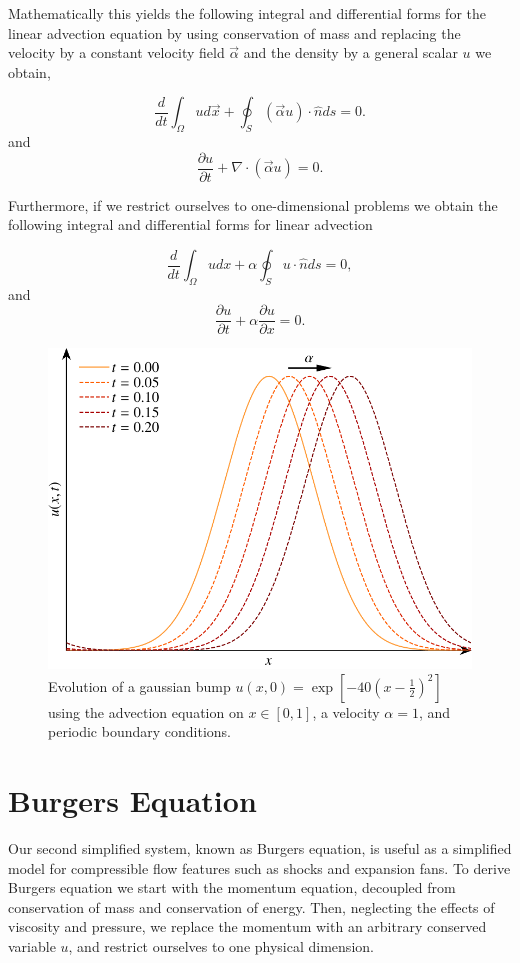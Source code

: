 Mathematically this yields the following integral and differential forms for the linear advection equation by using conservation of mass and replacing the velocity by a constant velocity field $\vec{\alpha}$ and the density by a general scalar $u$ we obtain,
\begin{eqBox}
\begin{equation}
	\frac{d}{dt}\int_\Omega u d\vec{x} + \oint_S (\vec{\alpha}u) \cdot \hat{n} ds = 0.
\end{equation}
and
\begin{equation}
	\frac{\partial u}{\partial t} + \nabla \cdot (\vec{\alpha} u) = 0.
\end{equation}
\end{eqBox}
Furthermore, if we restrict ourselves to one-dimensional problems we obtain the following integral and differential forms for linear advection
\begin{eqBox}
\begin{equation}
	\frac{d}{dt}\int_\Omega u dx + \alpha \oint_S u \cdot \hat{n} ds = 0,
\end{equation}
and
\begin{equation}
	\frac{\partial u}{\partial t} +  \alpha \frac{\partial u}{\partial x} = 0.
\end{equation}
\end{eqBox}
\begin{figure}[htbp]
	\centering
	\includegraphics[width=0.65\linewidth]{Pictures/advection_equation}
	\caption{Evolution of a gaussian bump $u(x,0)=\exp\left[-40\left(x-\frac{1}{2}\right)^2\right]$ using the advection equation on $x\in[0,1]$, a velocity $\alpha=1$, and periodic boundary conditions.}
	\label{fig:advection_equation}
\end{figure}

\section{Burgers Equation}
Our second simplified system, known as Burgers equation, is useful as a simplified model for compressible flow features such as shocks and expansion fans. To derive Burgers equation we start with the momentum equation, decoupled from conservation of mass and conservation of energy. Then, neglecting the effects of viscosity and pressure, we replace the momentum with an arbitrary conserved variable $u$, and restrict ourselves to one physical dimension. 

